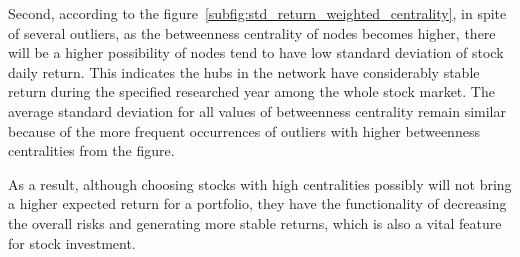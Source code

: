 Second, according to the figure~\ref{subfig:std_return_weighted_centrality}, in spite of several outliers, as the betweenness centrality of nodes becomes higher, there will be a higher possibility of nodes tend to have low standard deviation of stock daily return. This indicates the hubs in the network have considerably stable return during the specified researched year among the whole stock market. The average standard deviation for all values of betweenness centrality remain similar because of the more frequent occurrences of outliers with higher betweenness centralities from the figure.

As a result, although choosing stocks with high centralities possibly will not bring a higher expected return for a portfolio, they have the functionality of decreasing the overall risks and generating more stable returns, which is also a vital feature for stock investment.




